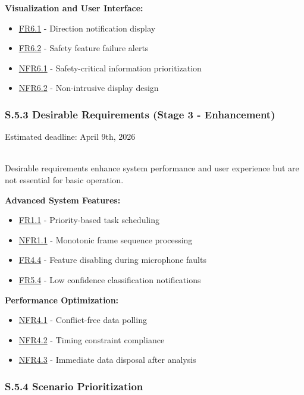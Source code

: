 \documentclass[12pt]{article}
\theoremstyle{definition}
\begin{document}
\textbf{Visualization and User Interface:}
\begin{itemize}
    \item \hyperref[FR6_1]{FR6.1} - Direction notification display
    \item \hyperref[FR6_2]{FR6.2} - Safety feature failure alerts
    \item \hyperref[NFR6_1]{NFR6.1} - Safety-critical information prioritization
    \item \hyperref[NFR6_2]{NFR6.2} - Non-intrusive display design
\end{itemize}

\subsubsection{S.5.3 Desirable Requirements (Stage 3 - Enhancement)}

Estimated deadline: April 9th, 2026

\\

Desirable requirements enhance system performance and user experience but are not essential for basic operation.

\textbf{Advanced System Features:}
\begin{itemize}
    \item \hyperref[FR1_1]{FR1.1} - Priority-based task scheduling
    \item \hyperref[NFR1_1]{NFR1.1} - Monotonic frame sequence processing
    \item \hyperref[FR4_4]{FR4.4} - Feature disabling during microphone faults
    \item \hyperref[FR5_4]{FR5.4} - Low confidence classification notifications
\end{itemize}

\textbf{Performance Optimization:}
\begin{itemize}
    \item \hyperref[NFR4_1]{NFR4.1} - Conflict-free data polling
    \item \hyperref[NFR4_2]{NFR4.2} - Timing constraint compliance
    \item \hyperref[NFR4_3]{NFR4.3} - Immediate data disposal after analysis
\end{itemize}

\subsubsection{S.5.4 Scenario Prioritization}
\end{document}
